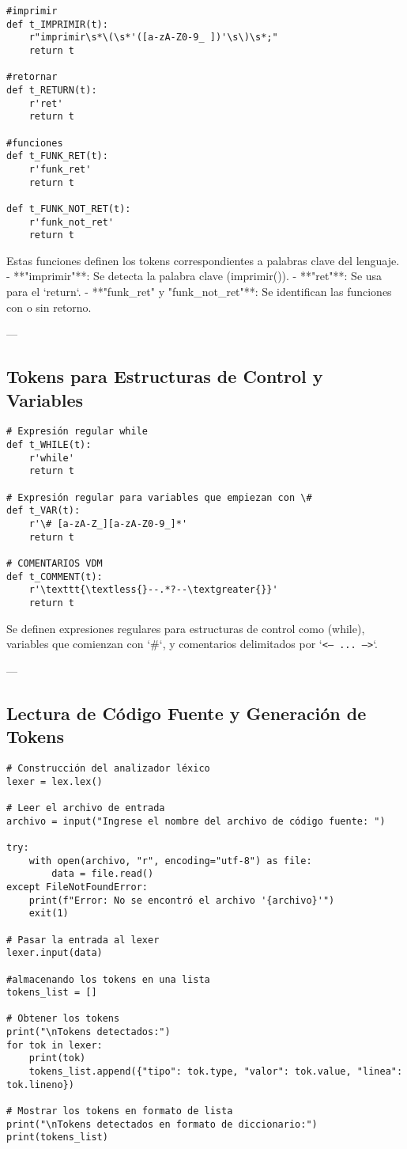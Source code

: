 \documentclass{article}
\begin{document}
\begin{verbatim}
#imprimir
def t_IMPRIMIR(t):
    r"imprimir\s*\(\s*'([a-zA-Z0-9_ ])'\s\)\s*;"
    return t

#retornar
def t_RETURN(t):
    r'ret'
    return t

#funciones
def t_FUNK_RET(t):
    r'funk_ret'
    return t

def t_FUNK_NOT_RET(t):
    r'funk_not_ret'
    return t
\end{verbatim}

Estas funciones definen los tokens correspondientes a palabras clave del lenguaje.  
- **"imprimir"**: Se detecta la palabra clave (imprimir()).  
- **"ret"**: Se usa para el `return`.  
- **"funk_ret" y "funk_not_ret"**: Se identifican las funciones con o sin retorno.

---

\subsection{Tokens para Estructuras de Control y Variables}

\begin{verbatim}
# Expresión regular while
def t_WHILE(t):
    r'while'
    return t

# Expresión regular para variables que empiezan con \#
def t_VAR(t):
    r'\# [a-zA-Z_][a-zA-Z0-9_]*'
    return t

# COMENTARIOS VDM
def t_COMMENT(t):
    r'\texttt{\textless{}--.*?--\textgreater{}}'
    return t
\end{verbatim}

Se definen expresiones regulares para estructuras de control como (while), variables que comienzan con `\#`, y comentarios delimitados por `\texttt{\textless{}-- ... --\textgreater{}}`.

---

\subsection{Lectura de Código Fuente y Generación de Tokens}

\begin{verbatim}
# Construcción del analizador léxico
lexer = lex.lex()

# Leer el archivo de entrada
archivo = input("Ingrese el nombre del archivo de código fuente: ")

try:
    with open(archivo, "r", encoding="utf-8") as file:
        data = file.read()
except FileNotFoundError:
    print(f"Error: No se encontró el archivo '{archivo}'")
    exit(1)

# Pasar la entrada al lexer
lexer.input(data)

#almacenando los tokens en una lista
tokens_list = []

# Obtener los tokens
print("\nTokens detectados:")
for tok in lexer:
    print(tok)
    tokens_list.append({"tipo": tok.type, "valor": tok.value, "linea": tok.lineno})

# Mostrar los tokens en formato de lista
print("\nTokens detectados en formato de diccionario:")
print(tokens_list)
\end{verbatim}
\end{document}
